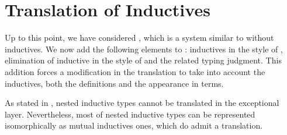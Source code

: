 \section{Translation of Inductives}

Up to this point, we have considered \CCw{}, which is a system similar to \CIC{} without inductives. We now 
add the following elements to \CCw{}: inductives in the style of ,
elimination of inductive in the style of  and the related typing judgment.
This addition forces a modification in the translation to take into account the inductives, 
both the definitions and the appearance in terms.

As stated in \cite{tabareau:FailureIsNotAnOption}, nested inductive types cannot be translated in the 
exceptional layer. Nevertheless,
most of nested inductive types can be represented isomorphically as mutual inductives ones,
which do admit a translation.

